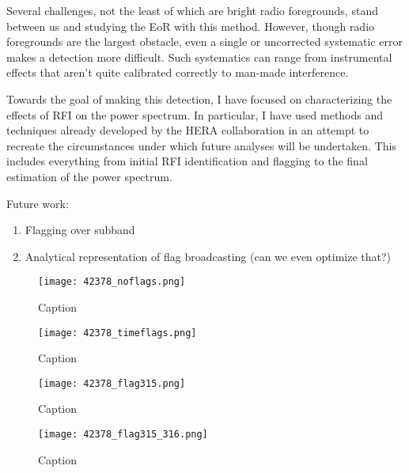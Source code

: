 \documentclass[12pt]{article}
\begin{document}
Several challenges, not the least of which are bright radio foregrounds, stand between us and studying the EoR with this method. However, though radio foregrounds are the largest obstacle, even a single  or uncorrected systematic error makes a detection more difficult. Such systematics can range from instrumental effects that aren't quite calibrated correctly to man-made interference.

Towards the goal of making this detection, I have focused on characterizing the effects of RFI on the power spectrum. In particular, I have used methods and techniques already developed by the HERA collaboration in an attempt to recreate the circumstances under which future analyses will be undertaken. This includes everything from initial RFI identification and flagging to the final estimation of the power spectrum.

Future work:
\begin{enumerate}
	\item Flagging over subband
	\item Analytical representation of flag broadcasting (can we even optimize that?)
\end{enumerate}




\begin{figure}[p]
	\centering
	\texttt{[image: 42378\_noflags.png]}
	\caption[Original power spectrum]{Caption}
	\label{fig:noflags}
\end{figure}

\begin{figure}[p]
	\centering
	\texttt{[image: 42378\_timeflags.png]}
	\caption[Power spectrum calculated with data flagged only in time]{Caption}
	\label{fig:time_flags}
\end{figure}

\begin{figure}[p]
	\centering
	\texttt{[image: 42378\_flag315.png]}
	\caption[Power spectrum calculated with flagged time integrations and one flagged channel]{Caption}
	\label{fig:flag_chan315}
\end{figure}

\begin{figure}[p]
	\centering
	\texttt{[image: 42378\_flag315\_316.png]}
	\caption[Power spectrum calculated with flagged time integrations and two contiguous flagged channels]{Caption}
	\label{fig:flag_chan315_316}
\end{figure}
\end{document}
